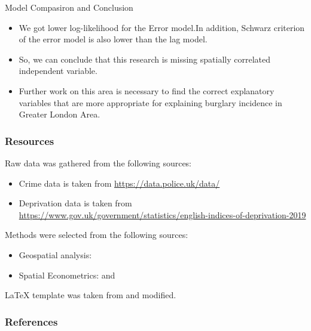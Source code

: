 \documentclass[10pt, aspectratio=169]{beamer}
\begin{document}
\begin{frame}{Model Compasiron and Conclusion}

    \begin{itemize}

        \item \textbf{}We got lower log-likelihood for the Error model.In addition, Schwarz criterion of the error model is also lower than the lag model.
        \item \textbf{}So, we can conclude that this research is missing spatially correlated independent variable.
        \item \textbf{}Further work on this area is necessary to find the correct explanatory variables that are more appropriate for explaining burglary incidence in Greater London Area.

    \end{itemize}

\end{frame}


\begin{frame}[t]
    \frametitle{Resources}
    Raw data was gathered from the following sources:
    \begin{itemize}
        \item Crime data is taken from \url{https://data.police.uk/data/}
        \item Deprivation data is taken from \url{https://www.gov.uk/government/statistics/english-indices-of-deprivation-2019}
    \end{itemize}

    Methods were selected from the following sources:
    \begin{itemize}
        \item Geospatial analysis: \citet{lawhead2019learning}
        \item Spatial Econometrics: \citet{anselin1988spatial} and \citet{kopczewska2020applied}
    \end{itemize}

    LaTeX template was taken from \citet{GaudeckerEconProjectTemplates} and modified.

    \note{~}
\end{frame}

\begin{frame}[allowframebreaks]
    \frametitle{References}
    \renewcommand{\bibfont}{\normalfont\footnotesize}
    \printbibliography
\end{frame}
\end{document}
